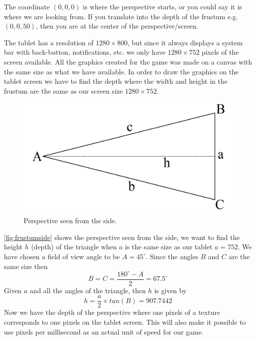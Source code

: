 The coordinate $(0, 0, 0)$ is where the perspective starts, or you could say it is where we are looking from. If you translate into the depth of the frustum e.g. $(0, 0, 50)$, then you are at the center of the perspective/screen.

The tablet has a resolution of $1280 \times 800$, but since it always displays a system bar with back-button, notifications, etc. we only have $1280 \times 752$ pixels of the screen available. All the graphics created for the game was made on a canvas with the same size as what we have available. In order to draw the graphics on the tablet screen we have to find the depth where the width and height in the frustum are the same as our screen size $1280 \times 752$.
\begin{figure}[H]
\centering
\includegraphics[width=0.5\linewidth]{img/trekant.png}
\caption{Perspective seen from the side.}
\label{fig:frustumside}
\end{figure}
\autoref{fig:frustumside} shows the perspective seen from the side, we want to find the height $h$ (depth) of the triangle when $a$ is the same size as our tablet $a = 752$. We have chosen a field of view angle to be $A = 45^{\circ}$. Since the angles $B$ and $C$ are the same size then
$$B = C = \frac{180^{\circ} - A}{2} = 67.5^{\circ}$$
Given $a$ and all the angles of the triangle, then $h$ is given by
$$h = \frac{a}{2} \times tan(B) = 907.7442$$
Now we have the depth of the perspective where one pixels of a texture corresponds to one pixels on the tablet screen. This will also make it possible to use pixels per millisecond as an actual unit of speed for our game.